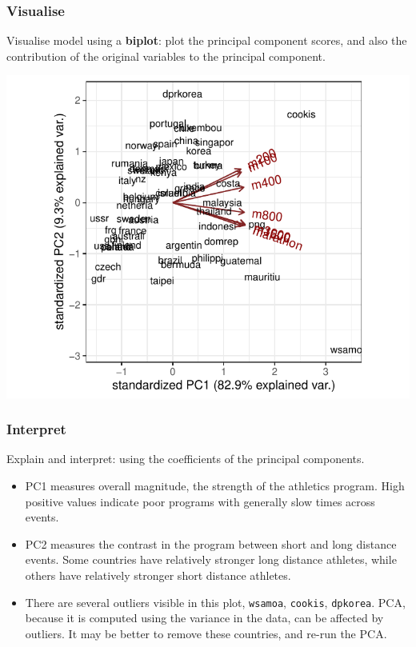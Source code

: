 \documentclass[a4paper]{article}\usepackage[]{graphicx}\usepackage[]{xcolor}
\makeatletter
\def\maxwidth{ %
  \ifdim\Gin@nat@width>\linewidth
    \linewidth
  \else
    \Gin@nat@width
  \fi
}
\makeatother
\begin{document}
\subsubsection{Visualise}
Visualise model using a \textbf{biplot}: plot the principal component scores, and also the contribution of the original variables to the principal component.
\begin{Schunk}


{\centering \includegraphics[width=\maxwidth]{figure/listings-unnamed-chunk-490-1} 

}

\end{Schunk}
\subsubsection{Interpret}
Explain and interpret: using the coefficients of the principal components.
\begin{itemize}
	\item PC1 measures overall magnitude, the strength of the athletics program. High positive values indicate \textcolor{myred}{poor} programs with generally slow times across events.
	\item PC2 measures the \textcolor{myred}{contrast} in the program between \textcolor{myred}{short and long distance} events. Some countries have relatively stronger long distance athletes, while others have relatively stronger short distance athletes.
	\item There are several \textcolor{myred}{outliers} visible in this plot, \lstinline|wsamoa|, \lstinline|cookis|, \lstinline|dpkorea|. PCA, because it is computed using the variance in the data, can be affected by outliers. It may be better to remove these countries, and re-run the PCA.
\end{itemize}
\end{document}
